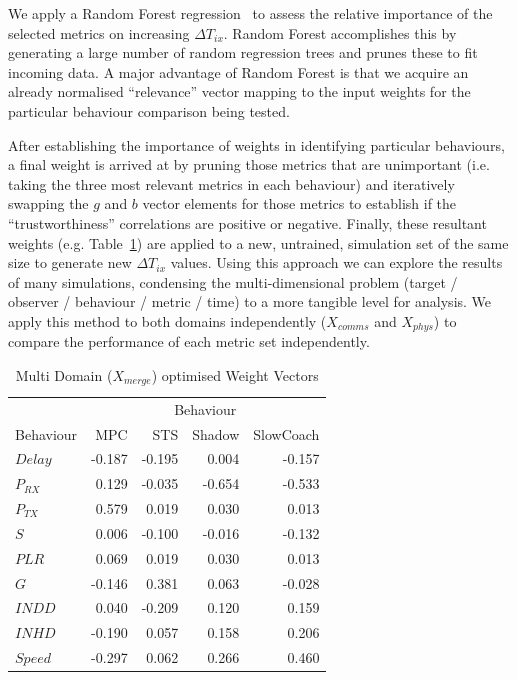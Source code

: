 \documentclass[conference]{IEEEtran}
\begin{document}
We apply a Random Forest regression~\cite{Breiman2001} to assess the relative importance of the selected metrics on increasing $\Delta  T_{ix}$. 
Random Forest accomplishes this by generating a large number of random regression trees and prunes these to fit incoming data. 
A major advantage of Random Forest is that we acquire an already normalised ``relevance'' vector mapping to the input weights for the particular behaviour comparison being tested.

After establishing the importance of weights in identifying particular behaviours, a final weight is arrived at by pruning those metrics that are unimportant (i.e. taking the three most relevant metrics in each behaviour) and iteratively swapping the $g$ and $b$ vector elements for those metrics to establish if the ``trustworthiness'' correlations are positive or negative.
Finally, these resultant weights (e.g. Table~\ref{tab:full_metric_correlations}) are applied to a new, untrained, simulation set of the same size to generate new $\Delta T_{ix}$ values.
Using this approach we can explore the results of many simulations, condensing the multi-dimensional problem (target / observer / behaviour / metric / time) to a more tangible level for analysis.
We apply this method to both domains independently ($X_{comms}$ and $X_{phys}$) to compare the performance of each metric set independently.
%
\begin{table}
  \centering
  \caption{Multi Domain ($X_{merge}$) optimised Weight Vectors}
  \begin{tabular}{lrrrr}
    \toprule
    & \multicolumn{4}{c}{Behaviour} \\ \cmidrule(r){2-5}
    Behaviour & MPC & STS & Shadow & SlowCoach  \\
    \midrule
    $Delay$ & -0.187 & -0.195 & 0.004 & -0.157  \\
    $P_{RX}$ & 0.129 & -0.035 & -0.654 & -0.533  \\
    $P_{TX}$ & 0.579 & 0.019 & 0.030 & 0.013  \\
    $S$ & 0.006 & -0.100 & -0.016 & -0.132  \\
    $PLR$ & 0.069 & 0.019 & 0.030 & 0.013  \\
    $G$ & -0.146 & 0.381 & 0.063 & -0.028  \\
    $INDD$ & 0.040 & -0.209 & 0.120 & 0.159  \\
    $INHD$ & -0.190 & 0.057 & 0.158 & 0.206  \\
    $Speed$ & -0.297 & 0.062 & 0.266 & 0.460  \\
    \bottomrule
  \end{tabular}
  \label{tab:full_metric_correlations}
\end{table}
 
\end{document}
